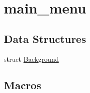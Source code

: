 \hypertarget{group__main__menu}{}\section{main\+\_\+menu}
\label{group__main__menu}
\subsection*{Data Structures}
\begin{DoxyCompactItemize}
\item 
struct \mbox{\hyperlink{struct_background}{Background}}
\end{DoxyCompactItemize}
\subsection*{Macros}
